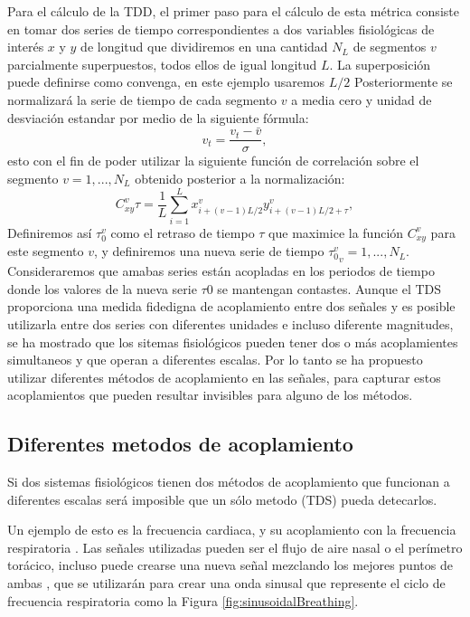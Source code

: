 \documentclass[twoside,twocolumn]{article}
\begin{document}
Para el cálculo de la TDD, el primer paso para el cálculo de esta métrica consiste en tomar dos series de tiempo correspondientes a dos variables fisiológicas de interés $x$ y $y$ de longitud que dividiremos en una cantidad $N_L$ de segmentos $v$ parcialmente superpuestos, todos ellos de igual longitud $L$.
La superposición puede definirse como convenga, en este ejemplo usaremos $L/2$
Posteriormente se normalizará la serie de tiempo de cada segmento $v$ a media cero y unidad de desviación estandar por medio de la siguiente fórmula:
\begin{equation}
  v_t = \frac{v_t-\bar{v}}{\sigma} ,
\end{equation}
esto con el fin de poder utilizar la siguiente función de correlación sobre el segmento $v = 1,...,N_L$ obtenido posterior a la normalización:
\begin{equation}
  C^v_{xy}\tau=\frac{1}{L}\sum^L_{i=1}x^v_{i+(v-1)L/2}y^v_{i+(v-1)L/2+\tau} ,
\end{equation}
Definiremos así $\tau^v_0$ como el retraso de tiempo $\tau$ que maximice la función $C^v_{xy}$ para este segmento $v$, y definiremos una nueva serie de tiempo ${\tau^v_0}_v=1,...,N_L$.
Consideraremos que amabas series están acopladas en los periodos de tiempo donde los valores de la nueva serie $\tau0$ se mantengan contastes.
Aunque el TDS proporciona una medida fidedigna de acoplamiento entre dos señales y es posible utilizarla entre dos series con diferentes unidades e incluso diferente magnitudes, se ha mostrado que los sitemas fisiológicos pueden tener dos o más acoplamientes simultaneos y que operan a diferentes escalas.
Por lo tanto se ha propuesto utilizar diferentes métodos de acoplamiento en las señales, para capturar estos acoplamientos que pueden resultar invisibles para alguno de los métodos.

\subsection{Diferentes metodos de acoplamiento}
Si dos sistemas fisiológicos tienen dos métodos de acoplamiento que funcionan a diferentes escalas será imposible que un sólo metodo (TDS) pueda detecarlos.

Un ejemplo de esto es la frecuencia cardiaca, y su acoplamiento con la frecuencia respiratoria \cite{bartsch2014coexisting}.
Las señales utilizadas pueden ser el flujo de aire nasal o el perímetro torácico, incluso puede crearse una nueva señal mezclando los mejores puntos de ambas \cite{bartsch2014coexisting}, que se utilizarán para crear una onda sinusal que represente el ciclo de frecuencia respiratoria como la Figura \ref{fig:sinusoidalBreathing}.
\end{document}
